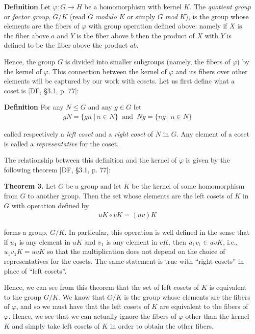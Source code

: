 \documentclass[11pt, reqno]{amsart}
\theoremstyle{plain}
\theoremstyle{definition}
\theoremstyle{example}
\begin{document}
\par
\textbf{Definition} Let $\varphi: G \to H$ be a homomorphism with kernel $K$. The \textit{quotient group} or \textit{factor group}, $G/K$ (read $G$ \textit{modulo} $K$ or simply $G$ \textit{mod} $K$), is the group whose elements are the fibers of $\varphi$ with group operation defined above: namely if $X$ is the fiber above $a$ and $Y$ is the fiber above $b$ then the product of $X$ with $Y$ is defined to be the fiber above the product $ab$.

\par
Hence, the group $G$ is divided into smaller subgroups (namely, the fibers of $\varphi$) by the kernel of $\varphi$. This connection between the kernel of $\varphi$ and its fibers over other elements will be captured by our work with cosets. Let us first define what a coset is [DF, \S 3.1, p. 77]:

\par
\textbf{Definition} For any $N \le G$ and any $g \in G$ let
\begin{align*}
gN = \{gn \ | \ n \in N\} \;\; \text{and} \;\; Ng = \{ng \ | \ n \in N\}
\end{align*}

called respectively a \textit{left coset} and a \textit{right coset} of $N$ in $G$. Any element of a coset is called a \textit{representative} for the coset. 

\par
The relationship between this definition and the kernel of $\varphi$ is given by the following theorem [DF, \S 3.1, p. 77]:

\par
\textbf{Theorem 3.} Let $G$ be a group and let $K$ be the kernel of some homomorphism from $G$ to another group. Then the set whose elements are the left cosets of $K$ in $G$ with operation defined by
\begin{align*}
uK \circ vK = (uv)K
\end{align*}

forms a group, $G/K$. In particular, this operation is well defined in the sense that if $u_1$ is any element in $uK$ and $v_1$ is any element in $vK$, then $u_1v_1 \in uvK$, i.e., $u_1v_1K = uvK$ so that the multiplication does not depend on the choice of representatives for the cosets. The same statement is true with ``right cosets'' in place of ``left cosets''.

\par
Hence, we can see from this theorem that the set of left cosets of $K$ is equivalent to the group $G/K$. We know that $G/K$ is the group whose elements are the fibers of $\varphi$, and so we must have that the left cosets of $K$ are equivalent to the fibers of $\varphi$. Hence, we see that we can actually ignore the fibers of $\varphi$ other than the kernel $K$ and simply take left cosets of $K$ in order to obtain the other fibers.
\end{document}
